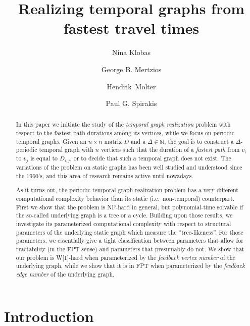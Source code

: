 \documentclass[a4paper,UKenglish,cleveref, autoref, thm-restate]{lipics-v2021}
\title{Realizing temporal graphs from fastest travel times} %
\author{Nina Klobas}{Department of Computer Science, Durham University, UK}{nina.klobas@durham.ac.uk}{ https://orcid.org/0000-0002-8024-5782}{}
\author{George B. Mertzios}{Department of Computer Science, Durham University, UK}{george.mertzios@durham.ac.uk}{https://orcid.org/0000-0001-7182-585X}{Supported by the EPSRC grant EP/P020372/1.}
\author{Hendrik~Molter}{Department of Computer Science, Ben-Gurion~University~of~the~Negev, 
Beer-Sheva, 
Israel}{molterh@post.bgu.ac.il}{https://orcid.org/0000-0002-4590-798X}{Supported by the ISF, grant No.~1456/18, and the ERC, grant number 949707.}
\author{Paul G. Spirakis}{Department of Computer Science, University of Liverpool, UK}{p.spirakis@liverpool.ac.uk}{https://orcid.org/0000-0001-5396-3749}{Supported by the EPSRC grant EP/P02002X/1.}
\begin{document}
\maketitle

\begin{abstract}
In this paper we initiate the study of the \emph{temporal graph realization} problem with respect to the fastest path durations among its vertices, 
while we focus on periodic temporal graphs. 
Given an $n \times n$ matrix $D$ and a $\Delta \in \mathbb{N}$, the goal is to construct a $\Delta$-periodic temporal graph with $n$ vertices 
such that the duration of a \emph{fastest path} from $v_i$ to $v_j$ is equal to $D_{i,j}$, or to decide that such a temporal graph does not exist. 
The variations of the problem on static graphs has been well studied and understood since the 1960's, and this area of research remains active until nowadays. 

As it turns out, the periodic temporal graph realization problem has a very different computational complexity behavior than its static (i.e.~non-temporal) counterpart. 
First we show that the problem is NP-hard in general, but polynomial-time solvable if the so-called underlying graph is a tree or a cycle.
Building upon those results, we investigate its parameterized computational complexity with respect to structural parameters of the underlying static graph which measure the ``tree-likeness''. For those parameters, we essentially give a tight classification between parameters that allow for tractability (in the FPT sense) and parameters that presumably do not.
We show that our problem is W[1]-hard when parameterized by the \emph{feedback vertex number} of the underlying graph, while we show that it is in FPT when parameterized by the \emph{feedback edge number} of the underlying graph. 





\end{abstract}



\section{Introduction}\label{intro-sec}
\end{document}
